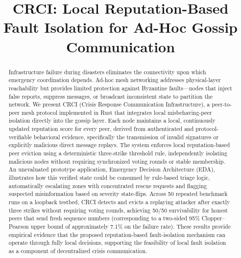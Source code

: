 \documentclass[conference]{IEEEtran}
\begin{document}
\title{CRCI: Local Reputation-Based Fault Isolation for Ad-Hoc Gossip Communication}

\author{
}

\maketitle

\begin{abstract}
Infrastructure failure during disasters eliminates the connectivity upon which emergency coordination depends. Ad-hoc mesh networking addresses physical-layer reachability but provides limited protection against Byzantine faults---nodes that inject false reports, suppress messages, or broadcast inconsistent state to partition the network. We present CRCI (Crisis Response Communication Infrastructure), a peer-to-peer mesh protocol implemented in Rust that integrates local misbehaving-peer isolation directly into the gossip layer. Each node maintains a local, continuously updated reputation score for every peer, derived from authenticated and protocol-verifiable behavioral evidence, specifically the transmission of invalid signatures or explicitly malicious direct message replays. The system enforces local reputation-based peer eviction using a deterministic three-strike threshold rule, independently isolating malicious nodes without requiring synchronized voting rounds or stable membership. An unevaluated prototype application, Emergency Decision Architecture (EDA), illustrates how this verified state could be consumed by rule-based triage logic, automatically escalating zones with concentrated rescue requests and flagging suspected misinformation based on severity state-flips. Across 50 repeated benchmark runs on a loopback testbed, CRCI detects and evicts a replaying attacker after exactly three strikes without requiring voting rounds, achieving 50/50 survivability for honest peers that send fresh sequence numbers (corresponding to a two-sided 95\% Clopper--Pearson upper bound of approximately 7.1\% on the failure rate). These results provide empirical evidence that the proposed reputation-based fault-isolation mechanism can operate through fully local decisions, supporting the feasibility of local fault isolation as a component of decentralized crisis communication.
\end{abstract}
\end{document}
